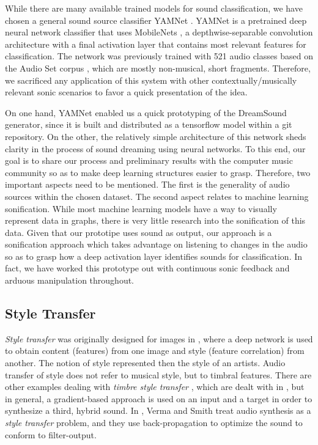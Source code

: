 \documentclass[a4paper,10pt,oneside]{article}
\begin{document}
\begin{sloppy}
While there are many available trained models for sound classification, we have chosen a general sound source classifier YAMNet \cite{YamNet2020}. YAMNet is a pretrained deep neural network classifier that uses MobileNets \cite{howard2017mobilenets}, a depthwise-separable convolution architecture with a final activation layer that contains most relevant features for classification. The network was previously trained with 521 audio classes based on the Audio  Set corpus \cite{2017audioset}, which are mostly non-musical, short fragments. Therefore, we sacrificed any application of this system with other contextually/musically relevant sonic scenarios to favor a quick presentation of the idea. 

On one hand, YAMNet enabled us a quick prototyping of the DreamSound generator, since it is built and distributed as a tensorflow model within a git repository. On the other, the relatively simple architecture of this network sheds clarity in the process of sound dreaming using neural networks. To this end, our goal is to share our process and preliminary results with the computer music community so as to make deep learning structures easier to grasp. Therefore, two important aspects need to be mentioned. The first is the generality of audio sources within the chosen dataset. The second aspect relates to machine learning sonification. While most machine learning models have a way to visually represent data in graphs, there is very little research into the sonification of this data. Given that our prototipe uses sound as output, our approach is a sonification approach which takes advantage on listening to changes in the audio so as to grasp how a deep activation layer identifies sounds for classification. In fact, we have worked this prototype out with continuous sonic feedback and arduous manipulation throughout.

\subsection{Style Transfer}

\textit{Style transfer} was originally designed for images in \cite{GatysEB15a}, where a deep network is used to obtain content (features) from one image and style (feature correlation) from another. The notion of style represented then the style of an artists. Audio transfer of style does not refer to musical style, but to timbral features. There are other examples dealing with \textit{timbre style transfer} \cite{Foote2016, Ulyanov2016, Wyse2017}, which are dealt with in \cite{Briot2017}, but in general, a gradient-based approach is used on an input and a target in order to synthesize a third, hybrid sound. In \cite{verma2018neural}, Verma and Smith treat audio synthesis as a \textit{style transfer} problem, and they use back-propagation to optimize the sound to conform to filter-output. 















\end{sloppy}
\end{document}
